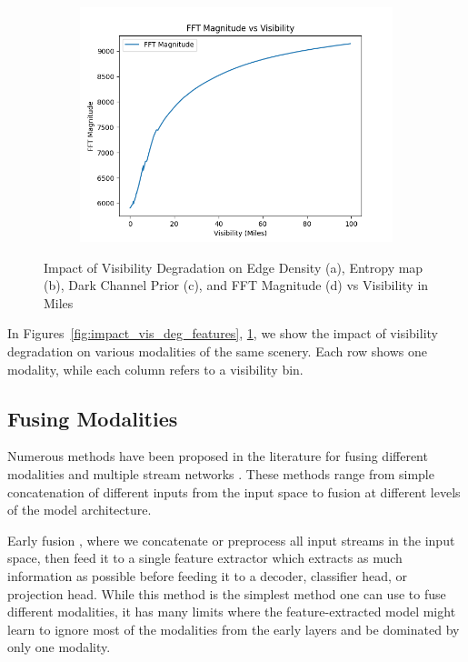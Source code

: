 \begin{figure}
\begin{subfigure}[b]{0.4\textwidth}
    \end{subfigure}
    \begin{subfigure}[b]{0.4\textwidth}
        \includegraphics[width=\textwidth]{imgs/fft_magnitude_vs_visibility.png}
    \end{subfigure}
    \caption{Impact of Visibility Degradation on Edge Density (a), Entropy map (b), Dark Channel Prior (c), and FFT Magnitude (d) vs Visibility in Miles}
    \label{fig:mean_of_features}
\end{figure}

 In Figures~\ref{fig:impact_vis_deg_features}, \ref{fig:mean_of_features}, we show the impact of visibility degradation on various modalities of the same scenery. Each row shows one modality, while each column refers to a visibility bin.
\subsection{Fusing Modalities}
Numerous methods have been proposed in the literature for fusing different modalities and multiple stream networks \cite{akkus2023multimodal, radford2021learning, jia2021scaling}. These methods range from simple concatenation of different inputs from the input space to fusion at different levels of the model architecture. 

Early fusion \cite{huang_fusion_2020}, where we concatenate or preprocess all input streams in the input space, then feed it to a single feature extractor which extracts as much information as possible before feeding it to a decoder, classifier head, or projection head. While this method is the simplest method one can use to fuse different modalities, it has many limits where the feature-extracted model might learn to ignore most of the modalities from the early layers and be dominated by only one modality.

